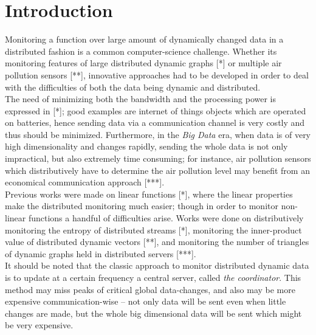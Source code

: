 \documentclass[10pt, conference]{IEEEtran}
\begin{document}
\section{Introduction}
Monitoring a function over large amount of dynamically changed data in a distributed fashion is a common computer-science challenge. Whether its monitoring features of large distributed dynamic graphs [*] or multiple air pollution sensors [**], innovative approaches had to be developed in order to deal with the difficulties of both the data being dynamic and distributed. \\
The need of minimizing both the bandwidth and the processing power is expressed in [*]; good examples are internet of things objects which are operated on batteries, hence sending data via a communication channel is very costly and thus should be minimized. Furthermore, in the \textit{Big Data} era, when data is of very high dimensionality and changes rapidly, sending the whole data is not only impractical, but also extremely time consuming; for instance, air pollution sensors which distributively have to determine the air pollution level may benefit from an economical communication approach [***]. \\
Previous works were made on linear functions [*], where the linear properties make the distributed monitoring much easier; though in order to monitor non-linear functions a handful of difficulties arise. Works were done on distributively monitoring the entropy of distributed streams [*], monitoring the inner-product value of distributed dynamic vectors [**], and monitoring the number of triangles of dynamic graphs held in distributed servers [***]. \\
It should be noted that the classic approach to monitor distributed dynamic data is to update at a certain frequency a central server, called \textit{the coordinator}. This method may miss peaks of critical global data-changes, and also may be more expensive communication-wise -- not only data will be sent even when little changes are made, but the whole big dimensional data will be sent which might be very expensive. \\
\end{document}
